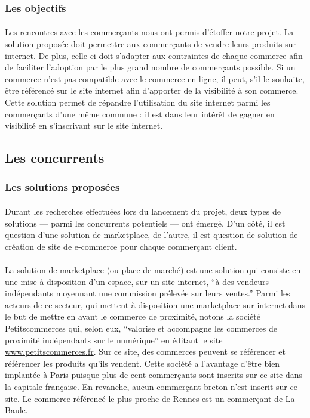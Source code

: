 \documentclass[a4paper, 12pt]{article}
\begin{document}
\subsubsection{Les objectifs}

\paragraph{}Les rencontres avec les commerçants nous ont permis d’étoffer notre projet. La solution proposée doit permettre aux commerçants de vendre leurs produits sur internet. De plus, celle-ci doit s’adapter aux contraintes de chaque commerce afin de faciliter l’adoption par le plus grand nombre de commerçants possible. Si un commerce n’est pas compatible avec le commerce en ligne, il peut, s’il le souhaite, être référencé sur le site internet afin d'apporter de la visibilité à son commerce. Cette solution permet de répandre l’utilisation du site internet parmi les commerçants d’une même commune : il est dans leur intérêt de gagner en visibilité en s’inscrivant sur le site internet.

\subsection{Les concurrents}
\subsubsection{Les solutions proposées}

\paragraph{}Durant les recherches effectuées lors du lancement du projet, deux types de solutions — parmi les concurrents potentiels — ont émergé. D’un côté, il est question d’une solution de marketplace, de l’autre, il est question de solution de création de site de e-commerce pour chaque commerçant client.
\paragraph{}La solution de marketplace (ou place de marché) est une solution qui consiste en une mise à disposition d’un espace, sur un site internet, “à des vendeurs indépendants moyennant une commission prélevée sur leurs ventes.” \cite{def_marketplace} Parmi les acteurs de ce secteur, qui mettent à disposition une marketplace sur internet dans le but de mettre en avant le commerce de proximité, notons la société Petitscommerces qui, selon eux, “valorise et accompagne les commerces de proximité indépendants sur le numérique” en éditant le site \url{www.petitscommerces.fr}. \cite{petitscommerces} Sur ce site, des commerces peuvent se référencer et référencer les produits qu’ils vendent. Cette société a l’avantage d’être bien implantée à Paris puisque plus de cent commerçants sont inscrits sur ce site dans la capitale française. En revanche, aucun commerçant breton n’est inscrit sur ce site. Le commerce référencé le plus proche de Rennes est un commerçant de La Baule.
\end{document}
